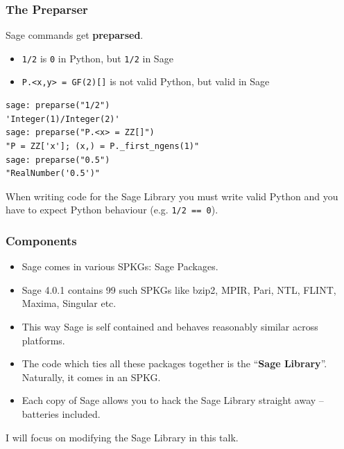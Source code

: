 \documentclass[11pt,blackandwhite]{beamer}
\renewcommand{\emph}[1]{{\color{black}\bf #1}}
\begin{document}
\begin{frame}[fragile]
\frametitle{The Preparser}
Sage commands get \emph{preparsed}.
\begin{itemize}
 \item \texttt{1/2} is \texttt{0} in Python, but \texttt{1/2} in Sage
 \item \texttt{P.<x,y> = GF(2)[]} is not valid Python, but valid in Sage
\end{itemize}

\begin{lstlisting}
sage: preparse("1/2")
'Integer(1)/Integer(2)'
sage: preparse("P.<x> = ZZ[]")
"P = ZZ['x']; (x,) = P._first_ngens(1)"
sage: preparse("0.5")
"RealNumber('0.5')"
\end{lstlisting}

When writing code for the Sage Library you must write valid Python and you have
to expect Python behaviour (e.g. \texttt{1/2 == 0}).
\end{frame}

\begin{frame}
\frametitle{Components}
\begin{itemize}
 \item Sage comes in various SPKGs: Sage Packages.
 \item Sage 4.0.1 contains 99 such SPKGs like bzip2, MPIR, Pari, NTL, FLINT,
Maxima, Singular etc.
 \item This way Sage is self contained and behaves reasonably similar across
platforms.
 \item The code which ties all these packages together is the ``\emph{Sage
Library}''. Naturally, it comes in an SPKG.
 \item Each copy of Sage allows you to hack the Sage Library straight away --
batteries included.
\end{itemize}

I will focus on modifying the Sage Library in this talk.
\end{frame}
\end{document}
